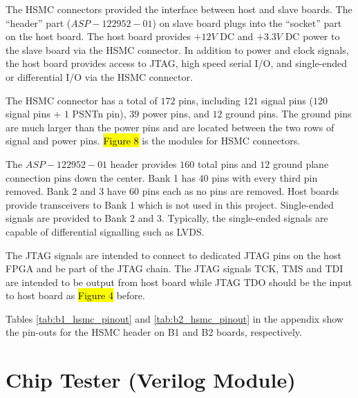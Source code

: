 The HSMC connectors provided the interface between host and slave boards. The ``header'' part ($ASP-122952-01$) on slave board plugs into the ``socket'' part on the host board. The host board provides $+12V$ DC and $+3.3V$ DC power to the slave board via the HSMC connector. In addition to power and clock signals, the host board provides access to JTAG, high speed serial I/O, and single-ended or differential I/O via the HSMC connector.

The HSMC connector has a total of $172$ pins, including $121$ signal pins ($120$ signal pins + $1$ PSNTn pin), $39$ power pins, and $12$ ground pins. The ground pins are much larger than the power pins and are located between the two rows of signal and power pins. \hl{Figure 8} is the modules for HSMC connectors.

The $ASP-122952-01$ header provides $160$ total pins and $12$ ground plane connection pins down the center. Bank 1 has $40$ pins with every third pin removed. Bank 2 and 3 have $60$ pins each as no pins are removed. Host boards provide transceivers to Bank 1 which is not used in this project. Single-ended signals are provided to Bank 2 and 3. Typically, the single-ended signals are capable of differential signalling such as LVDS.

The JTAG signals are intended to connect to dedicated JTAG pins on the host FPGA and be part of the JTAG chain. The JTAG signals TCK, TMS and TDI are intended to be output from host board while JTAG TDO should be the input to host board as \hl{Figure 4} before.

Tables \ref{tab:b1_hsmc_pinout} and \ref{tab:b2_hsmc_pinout} in the appendix show the pin-outs for the HSMC header on B1 and B2 boards, respectively.


\section{Chip Tester (Verilog Module)}


